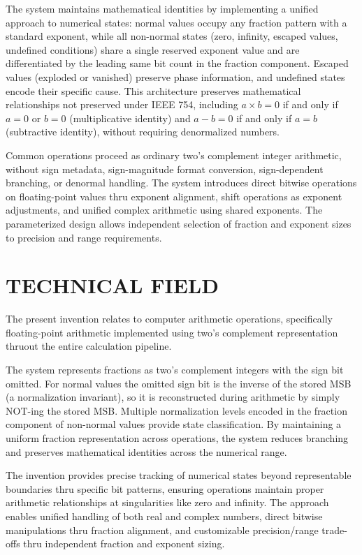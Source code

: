 \documentclass[12pt,letter]{article}
\begin{document}
The system maintains mathematical identities by implementing a unified approach to numerical states: normal values occupy any fraction pattern with a standard exponent, while all non-normal states (zero, infinity, escaped values, undefined conditions) share a single reserved exponent value and are differentiated by the leading same bit count in the fraction component. Escaped values (exploded or vanished) preserve phase information, and undefined states encode their specific cause. This architecture preserves mathematical relationships not preserved under IEEE 754, including $a\times b=0$ if and only if $a=0$ or $b=0$ (multiplicative identity) and $a-b=0$ if and only if $a=b$ (subtractive identity), without requiring denormalized numbers.

Common operations proceed as ordinary two's complement integer arithmetic, without sign metadata, sign-magnitude format conversion, sign-dependent branching, or denormal handling. The system introduces direct bitwise operations on floating-point values thru exponent alignment, shift operations as exponent adjustments, and unified complex arithmetic using shared exponents. The parameterized design allows independent selection of fraction and exponent sizes to precision and range requirements.

\newpage

\section{TECHNICAL FIELD}

The present invention relates to computer arithmetic operations, specifically floating-point arithmetic implemented using two's complement representation thruout the entire calculation pipeline.

The system represents fractions as two's complement integers with the sign bit omitted. For normal values the omitted sign bit is the inverse of the stored MSB (a normalization invariant), so it is reconstructed during arithmetic by simply NOT-ing the stored MSB. Multiple normalization levels encoded in the fraction component of non-normal values provide state classification. By maintaining a uniform fraction representation across operations, the system reduces branching and preserves mathematical identities across the numerical range.

The invention provides precise tracking of numerical states beyond representable boundaries thru specific bit patterns, ensuring operations maintain proper arithmetic relationships at singularities like zero and infinity. The approach enables unified handling of both real and complex numbers, direct bitwise manipulations thru fraction alignment, and customizable precision/range trade-offs thru independent fraction and exponent sizing.
\end{document}

